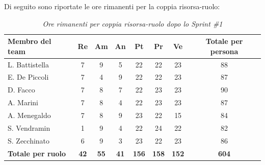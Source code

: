 ﻿\documentclass[a4paper, 10pt, colorlinks=true, linkcolor=black, urlcolor=blue, citecolor=blue, hidelinks]{article}
\renewcommand{\arraystretch}{1.2}
\begin{document}
Di seguito sono riportate le ore rimanenti per la coppia risorsa-ruolo:
\begin{table}[H]
    \centering
    \renewcommand{\arraystretch}{1.4}
    \begin{tabular}{|l|c|c|c|c|c|c|c|}
        \hline
        \rowcolor{bluBitless!15}
        \textbf{Membro del team} & \textbf{Re} & \textbf{Am} & \textbf{An} & \textbf{Pt} & \textbf{Pr} & \textbf{Ve} & \textbf{Totale per persona} \\
        \hline
        L. Battistella & 7 & 9 & 5 & 22 & 22 & 23 & 88 \\ \hline
        E. De Piccoli & 7 & 4 & 9 & 22 & 22 & 23 & 87 \\ \hline
        D. Facco & 7 & 8 & 7 & 22 & 23 & 23 & 90 \\ \hline
        A. Marini & 7 & 8 & 4 & 22 & 23 & 23 & 87 \\ \hline
        A. Menegaldo & 7 & 8 & 9 & 23 & 22 & 15 & 84 \\ \hline
        S. Vendramin & 1 & 9 & 4 & 22 & 24 & 22 & 82 \\ \hline
        S. Zecchinato & 6 & 9 & 3 & 23 & 22 & 23 & 86 \\ \hline
        \rowcolor{bluBitless!8}
        \textbf{Totale per ruolo} & \textbf{42} & \textbf{55} & \textbf{41} & \textbf{156} & \textbf{158} & \textbf{152} & \textbf{604} \\
        \hline
    \end{tabular}
    \caption{\textit{Ore rimanenti per coppia risorsa-ruolo dopo lo Sprint \#1}}
\end{table}
\end{document}
